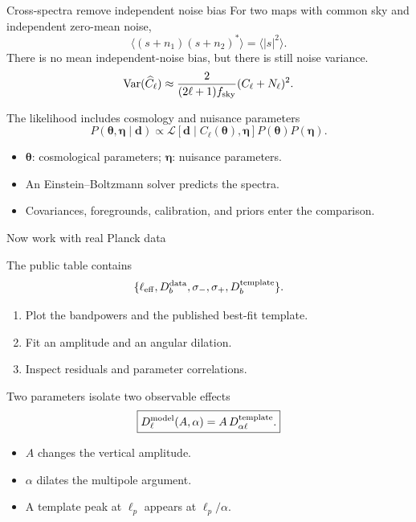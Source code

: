 \begin{frame}{Cross-spectra remove independent noise bias}
For two maps with common sky and independent zero-mean noise,
\[\langle(s+n_1)(s+n_2)^*\rangle=\langle|s|^2\rangle.\]
There is no mean independent-noise bias, but there is still noise variance.
\[\mathrm{Var}(\widehat C_\ell)\approx
\frac{2}{(2\ell+1)f_{\rm sky}}(C_\ell+N_\ell)^2.\]
\end{frame}

\begin{frame}{The likelihood includes cosmology and nuisance parameters}
\small
\[P(\bm\theta,\bm\eta\mid\mathbf d)\propto
\mathcal L[\mathbf d\mid C_\ell(\bm\theta),\bm\eta]
P(\bm\theta)P(\bm\eta).\]
\normalsize
\begin{itemize}
\item $\bm\theta$: cosmological parameters; $\bm\eta$: nuisance parameters.
\item An Einstein--Boltzmann solver predicts the spectra.
\item Covariances, foregrounds, calibration, and priors enter the comparison.
\end{itemize}
\end{frame}

\begin{frame}{Now work with real Planck data}
\Large\colabtwo\normalsize
\medskip\par The public table contains
\[\{\ell_{\rm eff},D_b^{\rm data},\sigma_-,\sigma_+,D_b^{\rm template}\}.\]
\begin{enumerate}
\item Plot the bandpowers and the published best-fit template.
\item Fit an amplitude and an angular dilation.
\item Inspect residuals and parameter correlations.
\end{enumerate}
\end{frame}

\begin{frame}{Two parameters isolate two observable effects}
\[\boxed{D_\ell^{\rm model}(A,\alpha)=A\,D_{\alpha\ell}^{\rm template}.}\]
\begin{itemize}
\item $A$ changes the vertical amplitude.
\item $\alpha$ dilates the multipole argument.
\item A template peak at $\ell_p$ appears at $\ell_p/\alpha$.
\end{itemize}
\end{frame}

